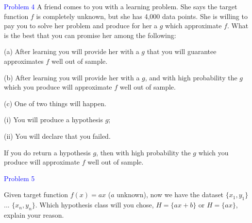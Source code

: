 \documentclass{article}
\begin{document}
\newpage

\textcolor{blue}{Problem 4}
A friend comes to you with a learning problem. She says the target function  $f$ is completely unknown, but she has 4,000 data points. She is willing to pay you to solve her problem and produce for her a $g$ which approximate $f$. What is the best that you can promise her among the following:

(a) After learning you will provide her with a $g$ that you will guarantee approximates $f$ well out of sample.

(b) After learning you will provide her with a $g$, and with high probability the $g$ which you produce will approximate $f$ well out of sample.

(c) One of two things will happen.

\quad(i) You will produce a hypothesis $g$;

\quad(ii) You will declare that you failed. 

\quad If you do return a hypothesis $g$, then with high probability the $g$ which you produce will approximate $f$ well out of sample.



\newpage



\textcolor{blue}{Problem 5}

Given target function $ f(x) = ax $ ($a$ unknown), now we have the dataset $\{x_1,y_1\}$ ... $\{x_n,y_n\}$. Which hypothesis class will you chose, $ H = \{ax + b\} $ or $H = \{ax\} $, explain your reason.
\end{document}
